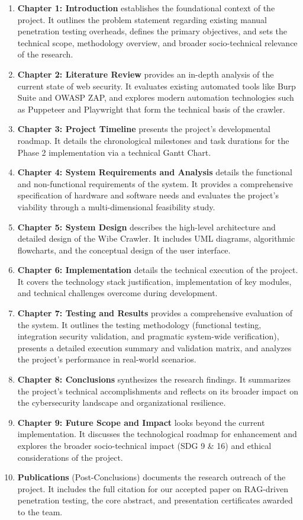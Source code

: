 \documentclass[12pt,oneside,a4paper]{book}
\begin{document}
\begin{enumerate}
    \item \textbf{Chapter 1: Introduction} establishes the foundational context of the project. It outlines the problem statement regarding existing manual penetration testing overheads, defines the primary objectives, and sets the technical scope, methodology overview, and broader socio-technical relevance of the research.
    \item \textbf{Chapter 2: Literature Review} provides an in-depth analysis of the current state of web security. It evaluates existing automated tools like Burp Suite and OWASP ZAP, and explores modern automation technologies such as Puppeteer and Playwright that form the technical basis of the crawler.
    \item \textbf{Chapter 3: Project Timeline} presents the project's developmental roadmap. It details the chronological milestones and task durations for the Phase 2 implementation via a technical Gantt Chart.
    \item \textbf{Chapter 4: System Requirements and Analysis} details the functional and non-functional requirements of the system. It provides a comprehensive specification of hardware and software needs and evaluates the project's viability through a multi-dimensional feasibility study.
    \item \textbf{Chapter 5: System Design} describes the high-level architecture and detailed design of the Wibe Crawler. It includes UML diagrams, algorithmic flowcharts, and the conceptual design of the user interface.
    \item \textbf{Chapter 6: Implementation} details the technical execution of the project. It covers the technology stack justification, implementation of key modules, and technical challenges overcome during development.
    \item \textbf{Chapter 7: Testing and Results} provides a comprehensive evaluation of the system. It outlines the testing methodology (functional testing, integration security validation, and pragmatic system-wide verification), presents a detailed execution summary and validation matrix, and analyzes the project's performance in real-world scenarios.
    \item \textbf{Chapter 8: Conclusions} synthesizes the research findings. It summarizes the project's technical accomplishments and reflects on its broader impact on the cybersecurity landscape and organizational resilience.
    \item \textbf{Chapter 9: Future Scope and Impact} looks beyond the current implementation. It discusses the technological roadmap for enhancement and explores the broader socio-technical impact (SDG 9 \& 16) and ethical considerations of the project.
    \item \textbf{Publications} (Post-Conclusions) documents the research outreach of the project. It includes the full citation for our accepted paper on RAG-driven penetration testing, the core abstract, and presentation certificates awarded to the team.
\end{enumerate}
\end{document}
